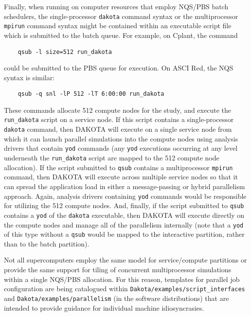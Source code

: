 Finally, when running on computer resources that employ NQS/PBS batch
schedulers, the single-processor \texttt{dakota} command syntax or the
multiprocessor \texttt{mpirun} command syntax might be contained
within an executable script file which is submitted to the batch
queue. For example, on Cplant, the command
\begin{small}
\begin{verbatim}
    qsub -l size=512 run_dakota
\end{verbatim}
\end{small}

could be submitted to the PBS queue for execution. On ASCI Red, the
NQS syntax is similar:
\begin{small}
\begin{verbatim}
    qsub -q snl -lP 512 -lT 6:00:00 run_dakota
\end{verbatim}
\end{small}

These commands allocate 512 compute nodes for the study, and execute
the \texttt{run\_dakota} script on a service node. If this script
contains a single-processor \texttt{dakota} command, then DAKOTA will
execute on a single service node from which it can launch parallel
simulations into the compute nodes using analysis drivers that contain
\texttt{yod} commands (any \texttt{yod} executions occurring at any
level underneath the \texttt{run\_dakota} script are mapped to the 512
compute node allocation). If the script submitted to \texttt{qsub}
contains a multiprocessor \texttt{mpirun} command, then DAKOTA will
execute across multiple service nodes so that it can spread the
application load in either a message-passing or hybrid parallelism
approach. Again, analysis drivers containing \texttt{yod} commands
would be responsible for utilizing the 512 compute nodes. And,
finally, if the script submitted to \texttt{qsub} contains a
\texttt{yod} of the \texttt{dakota} executable, then DAKOTA will
execute directly on the compute nodes and manage all of the
parallelism internally (note that a \texttt{yod} of this type without
a \texttt{qsub} would be mapped to the interactive partition, rather
than to the batch partition).

Not all supercomputers employ the same model for service/compute
partitions or provide the same support for tiling of concurrent
multiprocessor simulations within a single NQS/PBS allocation.  For
this reason, templates for parallel job configuration are being
catalogued within {\tt Dakota/examples/script\_interfaces} and 
\texttt{Dakota/examples/parallelism} (in the software
distributions) that are intended to provide guidance for individual
machine idiosyncrasies.

